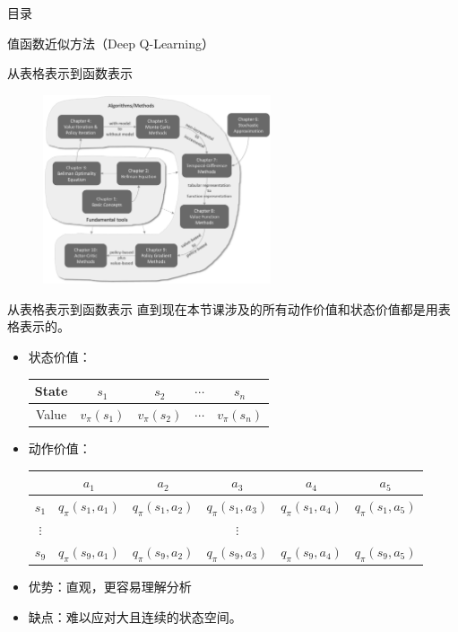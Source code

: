 \begin{frame}{目录}
    \tableofcontents
\end{frame}

\begin{section}{值函数近似方法\alert{（Deep Q-Learning）}}

\begin{frame}{从表格表示到函数表示}
    \begin{figure}
        \centering
        \includegraphics[width=0.6\textwidth]{assets/Figure_chapterMap.png}
    \end{figure}
\end{frame}

\begin{frame}{从表格表示到函数表示}
    直到现在本节课涉及的所有动作价值和状态价值都是用\alert{表格}表示的。
    \begin{itemize}
        \item 状态价值：
        \begin{table}[]
            \begin{tabular}{@{}ccccc@{}}
            \toprule
            State & $s_1$& $s_2$& $\cdots$& $s_n$\\ \midrule
            Value & $v_\pi(s_1)$& $v_\pi(s_2)$& $\cdots$& $v_\pi(s_n)$\\
            \bottomrule
            \end{tabular}
        \end{table}
        \item 动作价值：
        \begin{table}[]
            \begin{tabular}{@{}cccccc@{}}
            \toprule
             & $a_1$& $a_2$& $a_3$& $a_4$& $a_5$\\ \midrule
            $s_1$ & $q_\pi(s_1,a_1)$& $q_\pi(s_1,a_2)$& $q_\pi(s_1,a_3)$& $q_\pi(s_1,a_4)$& $q_\pi(s_1,a_5)$\\
            $\vdots$ &&&$\vdots$&&  \\
            $s_9$  & $q_\pi(s_9,a_1)$& $q_\pi(s_9,a_2)$& $q_\pi(s_9,a_3)$& $q_\pi(s_9,a_4)$& $q_\pi(s_9,a_5)$\\
            \bottomrule
            \end{tabular}
        \end{table}
        \item \alert{优势}：直观，更容易理解分析
        \item \alert{缺点}：难以应对大且\alert{连续}的状态空间。
        

\end{itemize}
\end{frame}
\end{section}
